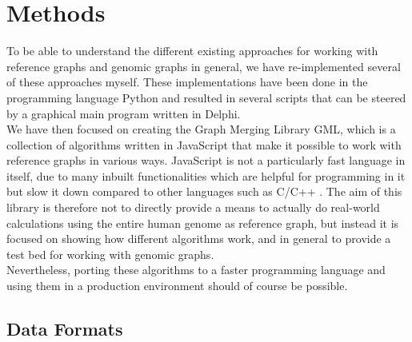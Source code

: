 \documentclass[a4paper,12pt,twoside,BCOR=10mm]{scrbook}
\begin{document}
\chapter{Methods}
%

To be able to understand the different existing approaches for working with 
reference graphs and genomic graphs in general, we have re-implemented several 
of these approaches myself. These implementations have been done in the programming 
language Python and resulted in several scripts that can be steered 
by a graphical main program written in Delphi. \\
We have then focused on creating the Graph Merging Library GML, which is a 
collection of algorithms written in JavaScript that make it possible to 
work with reference graphs in various ways. JavaScript is not a particularly fast 
language in itself, due to many inbuilt functionalities which are helpful for programming 
in it but slow it down compared to other languages such as C/C++ \citep{Taivalsaari2008}. 
The aim of this library is therefore not to directly provide a means to actually do 
real-world calculations using the entire human genome as reference graph, 
but instead it is focused on showing how different algorithms work, 
and in general to provide a test bed for working with genomic graphs. \\
Nevertheless, porting these algorithms to a faster programming language 
and using them in a production environment should of course be possible.

\section{Data Formats}
%
\end{document}
